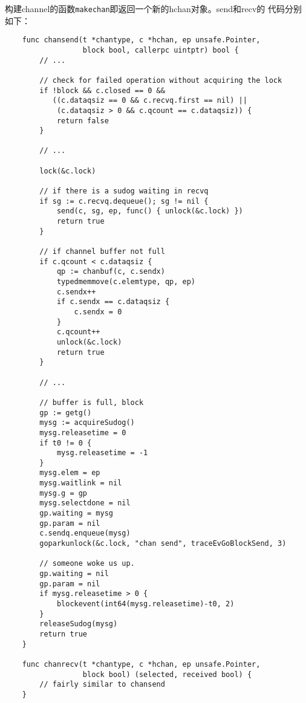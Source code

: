 \documentclass[UTF8,b5paper,fontset=adobe]{ctexart}
\begin{document}
构建channel的函数\verb+makechan+即返回一个新的hchan对象。send和recv的
代码分别如下：

\begin{verbatim}
    func chansend(t *chantype, c *hchan, ep unsafe.Pointer,
                  block bool, callerpc uintptr) bool {
        // ...

        // check for failed operation without acquiring the lock
        if !block && c.closed == 0 &&
           ((c.dataqsiz == 0 && c.recvq.first == nil) ||
            (c.dataqsiz > 0 && c.qcount == c.dataqsiz)) {
            return false
        }

        // ...

        lock(&c.lock)

        // if there is a sudog waiting in recvq
        if sg := c.recvq.dequeue(); sg != nil {
            send(c, sg, ep, func() { unlock(&c.lock) })
            return true
        }

        // if channel buffer not full
        if c.qcount < c.dataqsiz {
            qp := chanbuf(c, c.sendx)
            typedmemmove(c.elemtype, qp, ep)
            c.sendx++
            if c.sendx == c.dataqsiz {
                c.sendx = 0
            }
            c.qcount++
            unlock(&c.lock)
            return true
        }

        // ...
        
        // buffer is full, block
        gp := getg()
        mysg := acquireSudog()
        mysg.releasetime = 0
        if t0 != 0 {
            mysg.releasetime = -1
        }
        mysg.elem = ep
        mysg.waitlink = nil
        mysg.g = gp
        mysg.selectdone = nil
        gp.waiting = mysg
        gp.param = nil
        c.sendq.enqueue(mysg)
        goparkunlock(&c.lock, "chan send", traceEvGoBlockSend, 3)

        // someone woke us up.
        gp.waiting = nil
        gp.param = nil
        if mysg.releasetime > 0 {
            blockevent(int64(mysg.releasetime)-t0, 2)
        }
        releaseSudog(mysg)
        return true
    }

    func chanrecv(t *chantype, c *hchan, ep unsafe.Pointer, 
                  block bool) (selected, received bool) {
        // fairly similar to chansend
    }
\end{verbatim}


\end{document}

